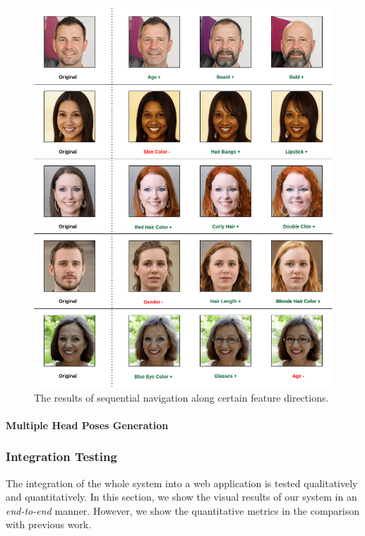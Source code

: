 \begin{figure}[H]
    \centering
    \includegraphics[width=\textwidth]{images/sequential-nav.png}
    \caption{The results of sequential navigation along certain feature directions.}
    \label{fig:nav_res}
\end{figure}

\paragraph{Multiple Head Poses Generation}

\subsubsection{Integration Testing}
The integration of the whole system into a web application is tested qualitatively and quantitatively. In this section, we show the visual results of our system in an \emph{end-to-end} manner. However, we show the quantitative metrics in the comparison with previous work. 

